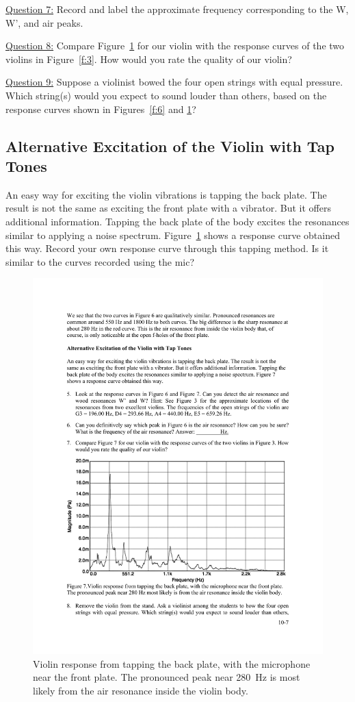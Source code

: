 \documentclass[11pt]{NSF}
\begin{document}
\underline{Question 7:}
Record and label the approximate frequency corresponding to the W, W', and air peaks. 

\underline{Question 8:}
Compare Figure~\ref{f:7} for our violin with the response curves of the two
violins in Figure~\ref{f:3}. 
How would you rate the quality of our violin?

\underline{Question 9:}
Suppose a violinist bowed the four open strings with equal pressure. 
Which string(s) would you expect to sound louder than others, based on
the response curves shown in Figures~\ref{f:6} and \ref{f:7}?

\subsection{Alternative Excitation of the Violin with Tap Tones}

An easy way for exciting the violin vibrations is tapping the back
plate. The result is not the same as exciting the front plate with a
vibrator. But it offers additional information. Tapping the back plate
of the body excites the resonances similar to applying a noise
spectrum. Figure~\ref{f:7} shows a response curve obtained this way.
Record your own response curve through this tapping method. Is it similar to the curves recorded using the mic?
%
\begin{figure}[hbtp]
\begin{center}
\includegraphics[width=.7\textwidth]{fig10_7}
\caption{Violin response from tapping the back plate, with the microphone near
the front plate. The pronounced peak near 280~Hz is most likely from
the air resonance inside the violin body.}
\label{f:7}
\end{center}
\end{figure}
%
\
\end{document}
